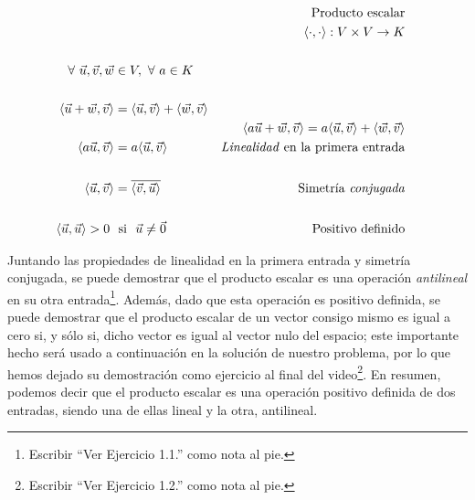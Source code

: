 \documentclass[12pt,dvipsnames]{article}
\numberwithin{equation}{section}
\begin{document}
\begin{align*}
    & &\text{Producto escalar}& &\\
    & &\langle\cdot,\cdot\rangle:V\times V\to K & &\\
    \\
    \forall \ \vec{u}, \vec{v}, \vec{w}&\in V, \ \forall \ a\in K\\
    \\
    \langle\vec{u}+\vec{w},\vec{v}\rangle &= \langle \vec{u} , \vec{v} \rangle + \langle \vec{w} , \vec{v} \rangle \\
                                          & &\langle a\vec{u}+\vec{w} , \vec{v} \rangle = a \langle \vec{u} , \vec{v} \rangle + \langle \vec{w} , \vec{v} \rangle\\
    \langle a\vec{u} , \vec{v} \rangle &= a \langle \vec{u} , \vec{v} \rangle &\text{\emph{Linealidad} en la primera entrada} \\
    \\
    \langle \vec{u} , \vec{v} \rangle &= \overline{ \langle \vec{v} , \vec{u} \rangle} &\text{Simetría \emph{conjugada}}\\
    \\
    \langle \vec{u}, \vec{u} \rangle > 0 \ &\ \text{si} \ \ \vec{u}\neq\vec{0} &\text{Positivo definido}
\end{align*}

\noindent Juntando las propiedades de linealidad en la primera entrada y simetría conjugada, se puede demostrar que el producto escalar es una operación \emph{antilineal} en su otra entrada\footnote{Escribir ``Ver Ejercicio 1.1.'' como nota al pie.}. Además, dado que esta operación es positivo definida, se puede demostrar que el producto escalar de un vector consigo mismo es igual a cero si, y sólo si, dicho vector es igual al vector nulo del espacio; este importante hecho será usado a continuación en la solución de nuestro problema, por lo que hemos dejado su demostración como ejercicio al final del video\footnote{Escribir ``Ver Ejercicio 1.2.'' como nota al pie.}. En resumen, podemos decir que el producto escalar es una operación positivo definida de dos entradas, siendo una de ellas lineal y la otra, antilineal.
\end{document}
